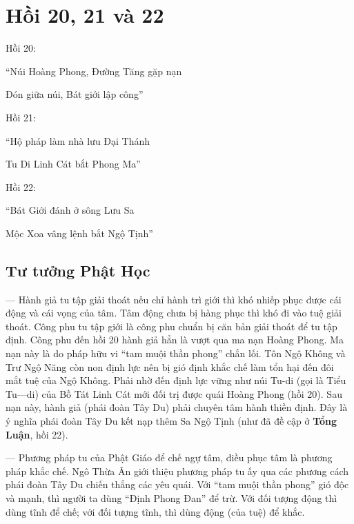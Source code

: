 \chapter{Hồi 20, 21 và 22} %
\label{cha:hoi_20_21_22}

Hồi 20:

\begin{itshape}
``Núi Hoàng Phong, Đường Tăng gặp nạn

Đón giữa núi, Bát giới lập công''
\end{itshape}

Hồi 21:

\begin{itshape}
``Hộ pháp làm nhà lưu Đại Thánh

Tu Di Linh Cát bắt Phong Ma''
\end{itshape}

Hồi 22:

\begin{itshape}
``Bát Giới đánh ở sông Lưu Sa

Mộc Xoa vâng lệnh bắt Ngộ Tịnh''
\end{itshape}

\section{Tư tưởng Phật Học} %
\label{sec:20_21_22_phat_hoc}

— Hành giả tu tập giải thoát nếu chỉ hành trì giới thì khó nhiếp phục được cái động và cái vọng của tâm. Tâm động chưa bị hàng phục thì khó đi vào tuệ giải thoát. Công phu tu tập giới là công phu chuẩn bị căn bản giải thoát để tu tập định. Công phu đến hồi 20 hành giả hẳn là vượt qua ma nạn Hoàng Phong. Ma nạn này là do pháp hữu vi ``tam muội thần phong'' chắn lối. Tôn Ngộ Không và Trư Ngộ Năng còn non định lực nên bị gió định khắc chế làm tổn hại đến đôi mắt tuệ của Ngộ Không. Phải nhờ đến định lực vững như núi Tu-di (gọi là Tiểu Tu—di) của Bồ Tát Linh Cát mới đối trị được quái Hoàng Phong (hồi 20). Sau nạn này, hành giả (phái đoàn Tây Du) phải chuyên tâm hành thiền định. Đây là ý nghĩa phái đoàn Tây Du kết nạp thêm Sa Ngộ Tịnh (như đã đề cập ở {\bf Tổng Luận}, hồi 22).

— Phương pháp tu của Phật Giáo để chế ngự tâm, điều phục tâm là phương pháp khắc chế. Ngô Thừa Ân giới thiệu phương pháp tu ấy qua các phương cách phái đoàn Tây Du chiến thắng các yêu quái. Với ``tam muội thần phong'' gió độc và mạnh, thì người ta dùng ``Định Phong Đan'' để trừ. Với đối tượng động thì dùng tĩnh để chế; với đối tượng tĩnh, thì dùng động (của tuệ) để khắc.

